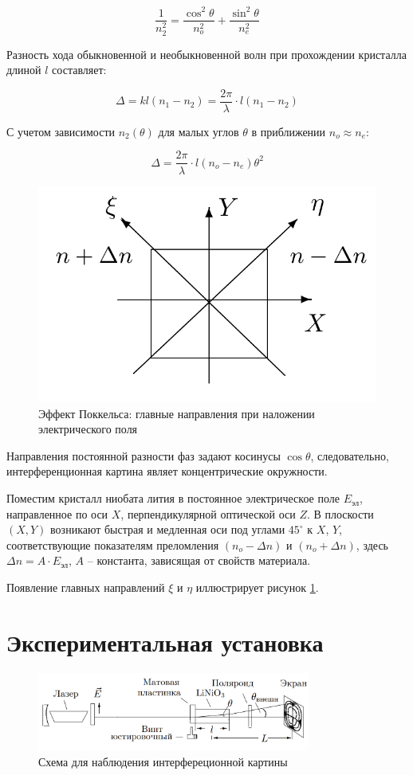 \documentclass[a4paper, 12pt]{article}
\begin{document}
	\[ \frac{1}{n_2^2} = \frac{\cos^2\theta}{n_o^2} + \frac{\sin^2\theta}{n_e^2} \]

	Разность хода обыкновенной и необыкновенной волн при прохождении кристалла длиной $l$ составляет:

	\[ \Delta = kl(n_1 - n_2) = \frac{2\pi}{\lambda} \cdot l (n_1 - n_2) \]

	С учетом зависимости $n_2(\theta)$ для малых углов $\theta$ в приближении $n_o \approx n_e$:

	\begin{equation}
		\Delta = \frac{2\pi}{\lambda}\cdot l (n_o - n_e)\theta^2
	\end{equation}

\clearpage
		\begin{figure}[h!]
			\centering
		\includegraphics[width=0.6\linewidth]{pokkels.png}
		\caption{Эффект Поккельса: главные направления при наложении электрического поля}
		\label{pokkels}
	\end{figure}


	Направления постоянной разности фаз задают косинусы $\cos\theta$, следовательно, интерференционная картина являет концентрические окружности.

	Поместим кристалл ниобата лития в постоянное электрическое поле $E_{эл}$, направленное по оси $X$, перпендикулярной оптической оси $Z$. В плоскости $(X,Y)$ возникают быстрая и медленная оси под углами $45^\circ$ к $X$, $Y$, соответствующие показателям преломления $(n_o - \Delta n)$ и $(n_o + \Delta n)$, здесь $\Delta n = A\cdot E_{эл}$, $A$ -- константа, зависящая от свойств материала.

	Появление главных направлений $\xi$ и $\eta$ иллюстрирует рисунок \ref{pokkels}.


\section{Экспериментальная установка}


\begin{figure}[h!]
\begin{center}
\includegraphics[width = 0.8\textwidth]{1.png}
\end{center}
\caption{Схема для наблюдения интерфереционной картины}
\label{scheme_watch}
\end{figure}
\end{document}
